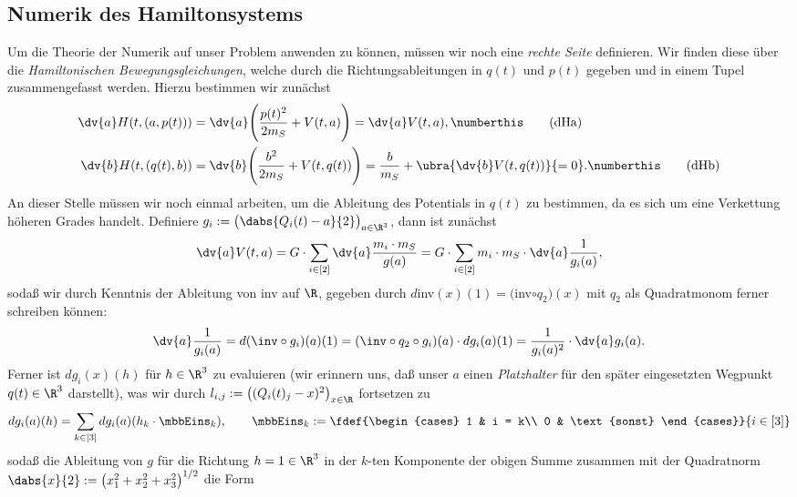 \documentclass{subfiles}
\begin{document}
    \subsection*{Numerik des Hamiltonsystems}
        Um die Theorie der Numerik auf unser Problem anwenden zu können, müssen wir noch eine \emph{rechte Seite} definieren. Wir finden diese über die \emph{Hamiltonischen Bewegungsgleichungen}, welche durch die Richtungsableitungen in $q(t)$ und $p(t)$ gegeben und in einem Tupel zusammengefasst werden. Hierzu bestimmen wir zunächst
        \begin{align*}
            \dv{a}H(t,(a,p(t))) &= \dv{a}\Biggl(
                \frac{p(t)^2}{2m_S} + V(t,a)
            \Biggr) = \dv{a}V(t,a),\numberthis\label{eq:dHa}\tag{dHa}\\
            \dv{b}H(t,(q(t),b)) &= \dv{b}\Biggl(
                \frac{b^2}{2m_S} + V(t,q(t))
            \Biggr) = \frac{b}{m_S} + \ubra{\dv{b}V(t,q(t))}{=0}.\numberthis\label{eq:dHb}\tag{dHb}
        \end{align*}    
        An dieser Stelle müssen wir noch einmal arbeiten, um die Ableitung des Potentials in $q(t)$ zu bestimmen, da es sich um eine Verkettung höheren Grades handelt. Definiere $g_i:=\bigl(\dabs{Q_i(t)-a}{2}\bigr)_{a\in\R^3}$, dann ist zunächst
        \[
            \dv{a}V(t,a) = G\cdot\sum_{i\in[2]}\dv{a}\frac{m_i\cdot m_S}{g(a)} = G\cdot\sum_{i\in[2]}m_i\cdot m_S\cdot\dv{a}\frac{1}{g_i(a)},
        \]
        sodaß wir durch Kenntnis der Ableitung von inv auf $\R$, gegeben durch $d$inv$(x)(1) = ($inv$\circ q_2)(x)$ mit $q_2$ als Quadratmonom ferner schreiben können:
        \[
            \dv{a}\frac{1}{g_i(a)} = d(\inv\circ g_i)(a)(1) = (\inv\circ q_2\circ g_i)(a)\cdot dg_i(a)(1) = \frac{1}{g_i(a)^2}\cdot \dv{a}g_i(a).  
        \]
        Ferner ist $dg_i(x)(h)$ für $h\in\R^3$ zu evaluieren (wir erinnern uns, daß unser $a$ einen \emph{Platzhalter} für den später eingesetzten Wegpunkt $q(t)\in\R^3$ darstellt), was wir durch $l_{i,j}:=\bigl((Q_i(t)_j - x)^2\bigr)_{x\in\R}$ fortsetzen zu
        \[
            dg_i(a)(h) = \sum_{k\in[3]}dg_i(a)(h_k\cdot\mbbEins_k), \qquad\mbbEins_{k}:=\fdef{\begin{cases}
                1 & i = k\\
                0 & \text{sonst}
            \end{cases}}{i\in[3]}
        \]
        sodaß die Ableitung von $g$ für die Richtung $h=1\in\R^3$ in der $k$-ten Komponente der obigen Summe zusammen mit der Quadratnorm $\dabs{x}{2} := \bigl(x_1^2 + x_2^2 + x_3^2\bigr)^{1/2}$ die Form 
\end{document}
